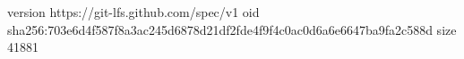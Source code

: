 version https://git-lfs.github.com/spec/v1
oid sha256:703e6d4f587f8a3ac245d6878d21df2fde4f9f4c0ac0d6a6e6647ba9fa2c588d
size 41881
